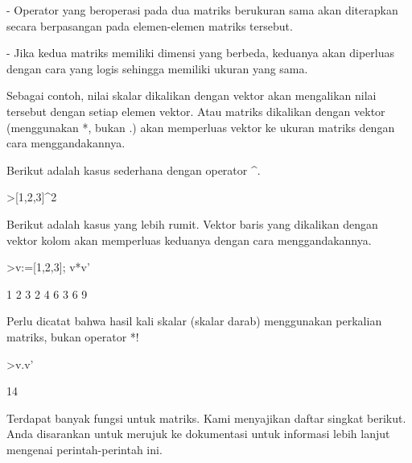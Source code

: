 \documentclass{article}
\newenvironment{eulernotebook}{\par}{\par}
\newenvironment{eulercomment}{\par\medskip}{\par\medskip}
\begin{document}
\begin{eulernotebook}
\begin{eulercomment}
\begin{eulercomment}
\begin{eulercomment}
\begin{eulercomment}
\begin{eulercomment}
\begin{eulercomment}
\begin{eulercomment}
- Operator yang beroperasi pada dua matriks berukuran sama akan
diterapkan secara berpasangan pada elemen-elemen matriks tersebut.

- Jika kedua matriks memiliki dimensi yang berbeda, keduanya akan
diperluas dengan cara yang logis sehingga memiliki ukuran yang sama.

Sebagai contoh, nilai skalar dikalikan dengan vektor akan mengalikan
nilai tersebut dengan setiap elemen vektor. Atau matriks dikalikan
dengan vektor (menggunakan *, bukan .) akan memperluas vektor ke
ukuran matriks dengan cara menggandakannya.

Berikut adalah kasus sederhana dengan operator \textasciicircum{}.
\end{eulercomment}
\begin{eulerprompt}
>[1,2,3]^2
\end{eulerprompt}
\begin{euleroutput}
  [1,  4,  9]
\end{euleroutput}
\begin{eulercomment}
Berikut adalah kasus yang lebih rumit. Vektor baris yang dikalikan
dengan vektor kolom akan memperluas keduanya dengan cara
menggandakannya.
\end{eulercomment}
\begin{eulerprompt}
>v:=[1,2,3]; v*v'
\end{eulerprompt}
\begin{euleroutput}
              1             2             3 
              2             4             6 
              3             6             9 
\end{euleroutput}
\begin{eulercomment}
Perlu dicatat bahwa hasil kali skalar (skalar darab) menggunakan
perkalian matriks, bukan operator *!
\end{eulercomment}
\begin{eulerprompt}
>v.v'
\end{eulerprompt}
\begin{euleroutput}
  14
\end{euleroutput}
\begin{eulercomment}
Terdapat banyak fungsi untuk matriks. Kami menyajikan daftar singkat
berikut. Anda disarankan untuk merujuk ke dokumentasi untuk informasi
lebih lanjut mengenai perintah-perintah ini.


\end{eulercomment}
\end{eulercomment}
\end{eulercomment}
\end{eulercomment}
\end{eulercomment}
\end{eulercomment}
\end{eulercomment}
\end{eulernotebook}
\end{document}
